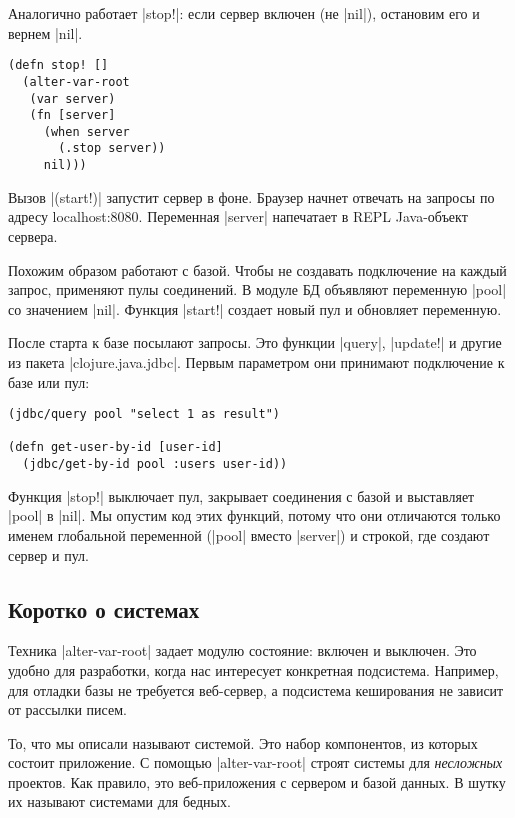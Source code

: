 \noindent
Аналогично работает \spverb|stop!|: если сервер включен (не \spverb|nil|),
остановим его и вернем \spverb|nil|.

\begin{verbatim}
(defn stop! []
  (alter-var-root
   (var server)
   (fn [server]
     (when server
       (.stop server))
     nil)))
\end{verbatim}

Вызов \spverb|(start!)| запустит сервер в фоне. Браузер начнет отвечать на
запросы по адресу localhost:8080. Переменная \spverb|server| напечатает в REPL
Java-объект сервера.

Похожим образом работают с базой. Чтобы не создавать подключение на каждый
запрос, применяют пулы соединений. В модуле БД объявляют переменную
\spverb|pool| со значением \spverb|nil|. Функция \spverb|start!| создает новый
пул и обновляет переменную.

После старта к базе посылают запросы. Это функции \spverb|query|,
\spverb|update!| и другие из пакета \spverb|clojure.java.jdbc|. Первым
параметром они принимают подключение к базе или пул:

\begin{verbatim}
(jdbc/query pool "select 1 as result")

(defn get-user-by-id [user-id]
  (jdbc/get-by-id pool :users user-id))
\end{verbatim}

Функция \spverb|stop!| выключает пул, закрывает соединения с базой и выставляет
\spverb|pool| в \spverb|nil|. Мы опустим код этих функций, потому что они
отличаются только именем глобальной переменной (\spverb|pool| вместо
\spverb|server|) и строкой, где создают сервер и пул.

\subsection{Коротко о системах}

Техника \spverb|alter-var-root| задает модулю состояние: включен и выключен. Это
удобно для разработки, когда нас интересует конкретная подсистема. Например, для
отладки базы не требуется веб-сервер, а подсистема кеширования не зависит от
рассылки писем.

То, что мы описали называют системой. Это набор компонентов, из которых состоит
приложение. С помощью \spverb|alter-var-root| строят системы для
\emph{несложных} проектов. Как правило, это веб-приложения с сервером и базой
данных. В шутку их называют системами для бедных.

